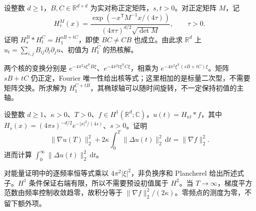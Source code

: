\begin{exercise}\label{b2:ex:12-anisotropic-convolution}
设整数 \(d\geq1\)，\(B,C\in\mathbb R^{d\times d}\) 为实对称正定矩阵，\(s,t>0\)。对正定矩阵 \(M\)，记
\[
 H_\tau^M(x)=\frac{\exp(-x^{\mathsf T}M^{-1}x/(4\tau))}
 {(4\pi\tau)^{d/2}\sqrt{\det M}},\qquad \tau>0.
\]
证明 \(H_s^B*H_t^C=H_1^{sB+tC}\)，即使 \(BC\ne CB\) 也成立。由此求 \(\mathbb R^d\) 上 \(u_t=\sum_{i,j}B_{ij}\partial_i\partial_ju\)、初值为 \(H_1^C\) 的热核解。
\end{exercise}
\begin{solution}
两个核的变换分别是 \(e^{-4\pi^2s\xi^{\mathsf T}B\xi}\)、\(e^{-4\pi^2t\xi^{\mathsf T}C\xi}\)，相乘为 \(e^{-4\pi^2\xi^{\mathsf T}(sB+tC)\xi}\)。矩阵 \(sB+tC\) 仍正定，Fourier 唯一性给出核等式；这里相加的是标量二次型，不需要矩阵交换。所求解为 \(H_1^{C+tB}\)，其椭球轴可以随时间旋转，不一定保持初值的主轴。
\end{solution}

\begin{exercise}\label{b2:ex:12-gradient-dissipation}
设整数 \(d\geq1\)、\(\kappa>0\)、\(T>0\)、\(f\in H^1(\mathbb R^d;\mathbb C)\)，\(u(t)=H_{\kappa t}*f\)，其中 \(H_s(x)=(4\pi s)^{-d/2}e^{-|x|^2/(4s)}\)、\(s>0\)。证明
\[
 \|\nabla u(T)\|_2^2
 +2\kappa\int_0^T\|\Delta u(t)\|_2^2\,\mathrm{d}t
 =\|\nabla f\|_2^2.
\]
进而计算 \(\int_0^\infty\|\Delta u(t)\|_2^2\,\mathrm{d}t\)。
\end{exercise}
\begin{solution}
对能量证明中的逐频率恒等式乘以 \(4\pi^2|\xi|^2\)，非负换序和 Plancherel 给出所述式子。\(H^1\) 条件保证右端有限，所以不需要预设初值属于 \(H^2\)。当 \(T\to\infty\)，梯度平方范数由频率控制收敛趋零，故积分等于 \(\|\nabla f\|_2^2/(2\kappa)\)。零频点的测度为零，不留下额外项。
\end{solution}

